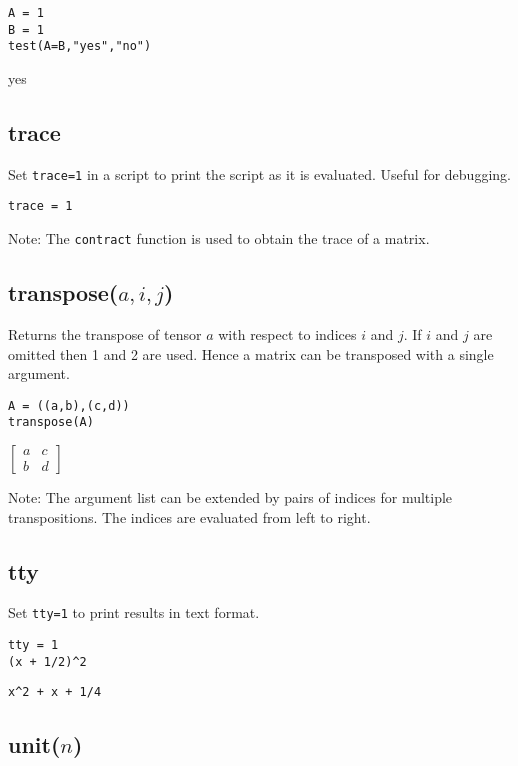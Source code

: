 {\color{blue}
\begin{verbatim}
A = 1
B = 1
test(A=B,"yes","no")
\end{verbatim}
}

\noindent
yes

\subsection*{trace}

Set {\tt trace=1} in a script to print the script as it is evaluated.
Useful for debugging.

{\color{blue}
\begin{verbatim}
trace = 1
\end{verbatim}
}

\noindent
Note:
The
\verb$contract$
function is used to obtain the trace of a matrix.

\subsection*{transpose($a,i,j$)}

Returns the transpose of tensor $a$ with respect to indices $i$ and $j$.
If $i$ and $j$ are omitted then 1 and 2 are used.
Hence a matrix can be transposed with a single argument.

{\color{blue}
\begin{verbatim}
A = ((a,b),(c,d))
transpose(A)
\end{verbatim}
}

\noindent
$\displaystyle
\begin{bmatrix}
a & c\\
b & d
\end{bmatrix}
$

\bigskip
\noindent
Note:
The argument list can be extended by pairs of indices for multiple transpositions.
The indices are evaluated from left to right.

\subsection*{tty}

Set {\tt tty=1} to print results in text format.

{\color{blue}
\begin{verbatim}
tty = 1
(x + 1/2)^2
\end{verbatim}
}

\noindent
\verb$x^2 + x + 1/4$

\subsection*{unit($n$)}

